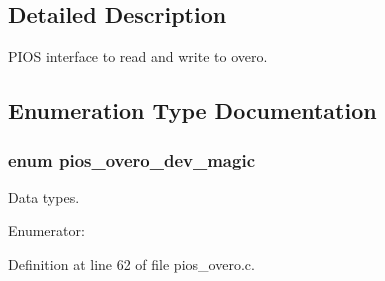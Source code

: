 \subsection{\-Detailed \-Description}
\-P\-I\-O\-S interface to read and write to overo. 

\subsection{\-Enumeration \-Type \-Documentation}
\hypertarget{group___p_i_o_s___o_v_e_r_o_ga9b9fb7573bead7d69299823fb7f7a372}{
\subsubsection[{pios\-\_\-overo\-\_\-dev\-\_\-magic}]{\setlength{\rightskip}{0pt plus 5cm}enum {\bf pios\-\_\-overo\-\_\-dev\-\_\-magic}}}\label{group___p_i_o_s___o_v_e_r_o_ga9b9fb7573bead7d69299823fb7f7a372}


\-Data types. 

\begin{Desc}
\item[\-Enumerator\-: ]\par
\begin{description}
\item[{\em 
\hypertarget{group___p_i_o_s___o_v_e_r_o_gga9b9fb7573bead7d69299823fb7f7a372a4b3b30ca1a20eb319f55d522e4eb1789}{\-P\-I\-O\-S\-\_\-\-O\-V\-E\-R\-O\-\_\-\-D\-E\-V\-\_\-\-M\-A\-G\-I\-C}\label{group___p_i_o_s___o_v_e_r_o_gga9b9fb7573bead7d69299823fb7f7a372a4b3b30ca1a20eb319f55d522e4eb1789}
}]\end{description}
\end{Desc}



\-Definition at line 62 of file pios\-\_\-overo.\-c.



